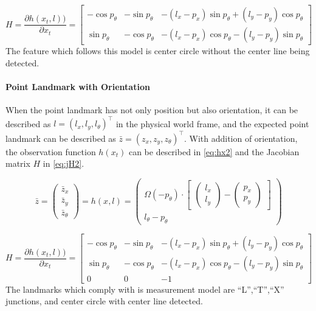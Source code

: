 \begin{equation}\label{eq:jH}
H =
\frac{\partial h(x_t,l))}{\partial x_t}
=
\begin{bmatrix}
  -\cos{p_{\theta}} & -\sin{p_{\theta}} & -(l_x-p_x)\sin{p_{\theta}} + (l_y-p_y)\cos{p_{\theta}} \\ 
  \sin{p_{\theta}} & -\cos{p_{\theta}} & -(l_x-p_x)\cos{p_{\theta}} - (l_y-p_y)\sin{p_{\theta}} 
\end{bmatrix}
\end{equation}
The feature which follows this model is center circle without the center line being detected.

\paragraph{Point Landmark with Orientation}\label{par:pointLandmark}
When the point landmark has not only position but also orientation, it can be described as $l = (l_x, l_y, l_{\theta})^\top$ in the physical world frame, and the expected point landmark can be described as $\bar{z} = (z_x, z_y, z_{\theta})^\top$.  With addition of orientation, the observation function $h(x_t)$ can be described in \autoref{eq:hx2} and the Jacobian matrix $H$ in \autoref{eq:jH2}.

\begin{equation}\label{eq:hx2}
  \bar{z} = \begin{pmatrix}
\bar{z}_{x}\\ 
\bar{z}_{y} \\
\bar{z}_{\theta} 
\end{pmatrix}
= 
h(x, l)
=
\begin{pmatrix}

\Omega(-p_{\theta})
\cdot
\begin{bmatrix}
 \begin{pmatrix}
l_{x}\\ 
l_{y}
\end{pmatrix}
-
\begin{pmatrix}
p_{x}\\ 
p_{y}
\end{pmatrix}
\end{bmatrix} \\
l_{\theta} - p_{\theta}
\end{pmatrix}
\end{equation}

\begin{equation}\label{eq:jH2}
H =
\frac{\partial h(x_t,l))}{\partial x_t}
=
\begin{bmatrix}
  -\cos{p_{\theta}} & -\sin{p_{\theta}} & -(l_x-p_x)\sin{p_{\theta}} + (l_y-p_y)\cos{p_{\theta}} \\ 
  \sin{p_{\theta}} & -\cos{p_{\theta}} & -(l_x-p_x)\cos{p_{\theta}} - (l_y-p_y)\sin{p_{\theta}}  \\
  0 & 0 & -1
\end{bmatrix}
\end{equation}
The landmarks which comply with is measurement model are ``L'',``T'',``X'' junctions, and center circle with center line detected.

